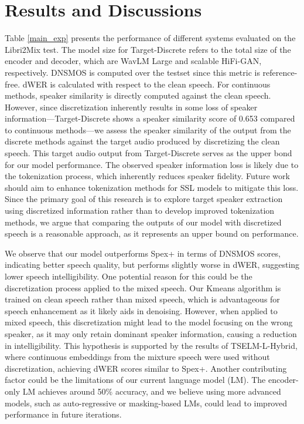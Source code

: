 \documentclass[conference]{IEEEtran}
\begin{document}
\section{Results and Discussions}
Table \ref{main_exp} presents the performance of different systems evaluated on the Libri2Mix test.
The model size for Target-Discrete refers to the total size of the encoder and 
decoder, which are WavLM Large and scalable HiFi-GAN, respectively. DNSMOS is computed over the 
testset since this metric is reference-free. dWER is calculated with respect to the clean speech. 
For continuous methods, speaker similarity is directly computed against the clean speech. 
However, since discretization inherently results in some loss of speaker information—Target-Discrete shows a speaker similarity score of 0.653 compared to continuous methods—we assess the speaker similarity of the output from the discrete methods against the target audio produced by discretizing the clean speech. 
This target audio output from Target-Discrete serves as the upper bond for our model performance.
The observed speaker information loss is likely due to the tokenization process, which inherently reduces speaker fidelity. Future work should aim to enhance tokenization methods for SSL models to mitigate this loss. Since the primary goal of this research is to explore target speaker extraction using discretized information rather than to develop improved tokenization methods, we argue that comparing the outputs of our model with discretized speech is a reasonable approach, as it represents an upper bound on performance.

We observe that our model outperforms Spex+ in terms of DNSMOS scores, indicating better speech quality, but performs slightly worse in dWER, suggesting lower speech intelligibility. One potential reason for this could be the discretization process applied to the mixed speech. Our Kmeans algorithm is trained on clean speech rather than mixed speech, which is advantageous for speech enhancement as it likely aids in denoising. However, when applied to mixed speech, this discretization might lead to the model focusing on the wrong speaker, as it may only retain dominant speaker information, causing a reduction in intelligibility.
This hypothesis is supported by the results of TSELM-L-Hybrid, where continuous embeddings from the mixture speech were used without discretization, achieving dWER scores similar to Spex+. Another contributing factor could be the limitations of our current language model (LM). The encoder-only LM achieves around 50\% accuracy, and we believe using more advanced models, such as auto-regressive or masking-based LMs, could lead to improved performance in future iterations.
\end{document}
